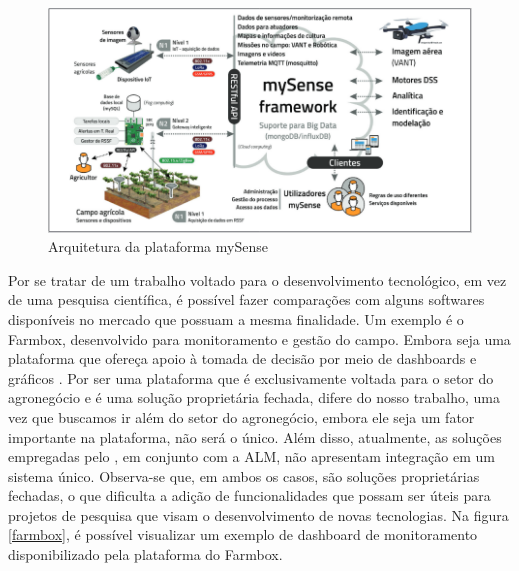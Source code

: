 \documentclass[tcc,capa]{texufpel}
\begin{document}
\begin{figure}[htbp]
  \centering \includegraphics[scale=.45]{assets/mysense.png}
  \caption{Arquitetura da plataforma mySense}
  \label{mysense}
\end{figure}

Por se tratar de um trabalho voltado para o desenvolvimento tecnológico, em vez de uma pesquisa científica, é possível fazer comparações com alguns softwares disponíveis no mercado que possuam a mesma finalidade. Um exemplo é o Farmbox, desenvolvido para monitoramento e gestão do campo. Embora seja uma plataforma que ofereça apoio à tomada de decisão por meio de dashboards e gráficos  \cite{farmbox:2022}. Por ser uma plataforma que é exclusivamente voltada para o setor do agronegócio e é uma solução proprietária fechada, difere do nosso trabalho, uma vez que buscamos ir além do setor do agronegócio, embora ele seja um fator importante na plataforma, não será o único. Além disso, atualmente, as soluções empregadas pelo \citet{hidrosedi:2022}, em conjunto com a ALM, não apresentam integração em um sistema único. Observa-se que, em ambos os casos, são soluções proprietárias fechadas, o que dificulta a adição de funcionalidades que possam ser úteis para projetos de pesquisa que visam o desenvolvimento de novas tecnologias. Na figura \ref{farmbox}, é possível visualizar um exemplo de dashboard de monitoramento disponibilizado pela plataforma do Farmbox.
\end{document}
